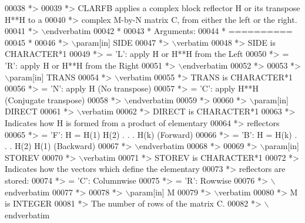 \begin{DoxyCode}
00038 \textcolor{comment}{*>}
00039 \textcolor{comment}{*> CLARFB applies a complex block reflector H or its transpose H**H to a}
00040 \textcolor{comment}{*> complex M-by-N matrix C, from either the left or the right.}
00041 \textcolor{comment}{*> \(\backslash\)endverbatim}
00042 \textcolor{comment}{*}
00043 \textcolor{comment}{*  Arguments:}
00044 \textcolor{comment}{*  ==========}
00045 \textcolor{comment}{*}
00046 \textcolor{comment}{*> \(\backslash\)param[in] SIDE}
00047 \textcolor{comment}{*> \(\backslash\)verbatim}
00048 \textcolor{comment}{*>          SIDE is CHARACTER*1}
00049 \textcolor{comment}{*>          = 'L': apply H or H**H from the Left}
00050 \textcolor{comment}{*>          = 'R': apply H or H**H from the Right}
00051 \textcolor{comment}{*> \(\backslash\)endverbatim}
00052 \textcolor{comment}{*>}
00053 \textcolor{comment}{*> \(\backslash\)param[in] TRANS}
00054 \textcolor{comment}{*> \(\backslash\)verbatim}
00055 \textcolor{comment}{*>          TRANS is CHARACTER*1}
00056 \textcolor{comment}{*>          = 'N': apply H (No transpose)}
00057 \textcolor{comment}{*>          = 'C': apply H**H (Conjugate transpose)}
00058 \textcolor{comment}{*> \(\backslash\)endverbatim}
00059 \textcolor{comment}{*>}
00060 \textcolor{comment}{*> \(\backslash\)param[in] DIRECT}
00061 \textcolor{comment}{*> \(\backslash\)verbatim}
00062 \textcolor{comment}{*>          DIRECT is CHARACTER*1}
00063 \textcolor{comment}{*>          Indicates how H is formed from a product of elementary}
00064 \textcolor{comment}{*>          reflectors}
00065 \textcolor{comment}{*>          = 'F': H = H(1) H(2) . . . H(k) (Forward)}
00066 \textcolor{comment}{*>          = 'B': H = H(k) . . . H(2) H(1) (Backward)}
00067 \textcolor{comment}{*> \(\backslash\)endverbatim}
00068 \textcolor{comment}{*>}
00069 \textcolor{comment}{*> \(\backslash\)param[in] STOREV}
00070 \textcolor{comment}{*> \(\backslash\)verbatim}
00071 \textcolor{comment}{*>          STOREV is CHARACTER*1}
00072 \textcolor{comment}{*>          Indicates how the vectors which define the elementary}
00073 \textcolor{comment}{*>          reflectors are stored:}
00074 \textcolor{comment}{*>          = 'C': Columnwise}
00075 \textcolor{comment}{*>          = 'R': Rowwise}
00076 \textcolor{comment}{*> \(\backslash\)endverbatim}
00077 \textcolor{comment}{*>}
00078 \textcolor{comment}{*> \(\backslash\)param[in] M}
00079 \textcolor{comment}{*> \(\backslash\)verbatim}
00080 \textcolor{comment}{*>          M is INTEGER}
00081 \textcolor{comment}{*>          The number of rows of the matrix C.}
00082 \textcolor{comment}{*> \(\backslash\)endverbatim}

\end{DoxyCode}
